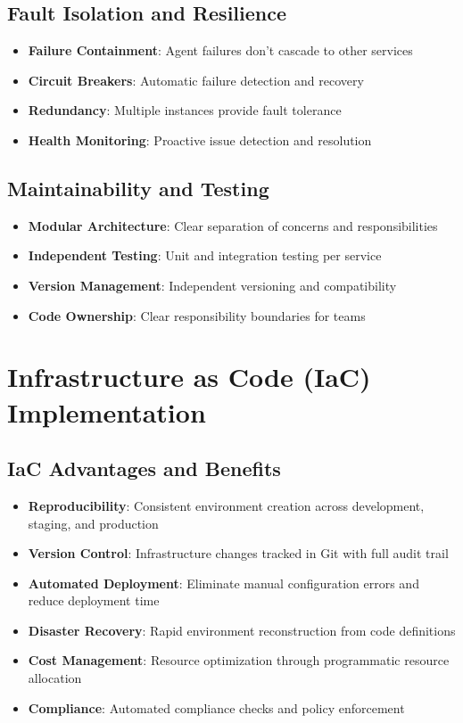 \documentclass[12pt]{report}
\begin{document}
\subsection{Fault Isolation and Resilience}
\begin{itemize}
  \item \textbf{Failure Containment}: Agent failures don't cascade to other services
  \item \textbf{Circuit Breakers}: Automatic failure detection and recovery
  \item \textbf{Redundancy}: Multiple instances provide fault tolerance
  \item \textbf{Health Monitoring}: Proactive issue detection and resolution
\end{itemize}

\subsection{Maintainability and Testing}
\begin{itemize}
  \item \textbf{Modular Architecture}: Clear separation of concerns and responsibilities
  \item \textbf{Independent Testing}: Unit and integration testing per service
  \item \textbf{Version Management}: Independent versioning and compatibility
  \item \textbf{Code Ownership}: Clear responsibility boundaries for teams
\end{itemize}

\section{Infrastructure as Code (IaC) Implementation}

\subsection{IaC Advantages and Benefits}
\begin{itemize}
  \item \textbf{Reproducibility}: Consistent environment creation across development, staging, and production
  \item \textbf{Version Control}: Infrastructure changes tracked in Git with full audit trail
  \item \textbf{Automated Deployment}: Eliminate manual configuration errors and reduce deployment time
  \item \textbf{Disaster Recovery}: Rapid environment reconstruction from code definitions
  \item \textbf{Cost Management}: Resource optimization through programmatic resource allocation
  \item \textbf{Compliance}: Automated compliance checks and policy enforcement
\end{itemize}
\end{document}
